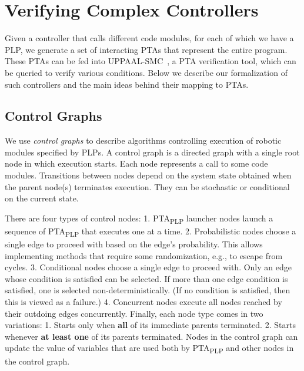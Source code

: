 \documentclass[letterpaper]{article}
\newcommand\rNote[1]{\todo[inline, author=Ronen, color=yellow]{#1}}
\newcommand\aNote[1]{\todo[inline, author=Alex, color=GreenYellow]{#1}}
\begin{document}

\section{Verifying Complex Controllers}
Given a controller that calls different code modules, for each of which we have a PLP, we generate a set of interacting PTAs that represent the entire program. These PTAs can be fed into UPPAAL-SMC~\cite{UPPAAL-SMC}, a PTA verification tool, which can be queried to verify various conditions. Below we describe our formalization of such controllers and the main ideas behind their mapping to PTAs. 
\subsection{Control Graphs}
\label{S:control}
We use {\em control graphs} to describe   algorithms controlling execution of robotic modules specified by PLPs. 
%
A control graph is a directed graph with a single root node in which execution starts. Each node
represents a call to some code modules. Transitions between nodes depend on the system state obtained when the parent node(s) terminates execution. They can be stochastic or conditional on the current state. 

There are four types of control nodes: 1. PTA\textsubscript{PLP} launcher nodes launch a sequence of PTA\textsubscript{PLP} that executes one at a time. 2. Probabilistic nodes choose a single edge to proceed with based on the edge's probability. This allows implementing methods that require some randomization, e.g., to escape from cycles.
3. Conditional nodes choose a single edge to proceed with. Only an edge whose condition is satisfied can be selected. If more than one edge condition is satisfied, one is selected non-deterministically.
(If no condition is satisfied, then this is viewed as a failure.) 
4. Concurrent nodes execute all nodes reached by their outdoing edges concurrently. 
Finally, each node type comes in two variations: 1. Starts only when \textbf{all} of its immediate parents terminated. 2. Starts whenever \textbf{at least one} of its parents terminated. Nodes in the control graph can update the value of variables that are used both by PTA\textsubscript{PLP} and other nodes in the control graph.
\end{document}
